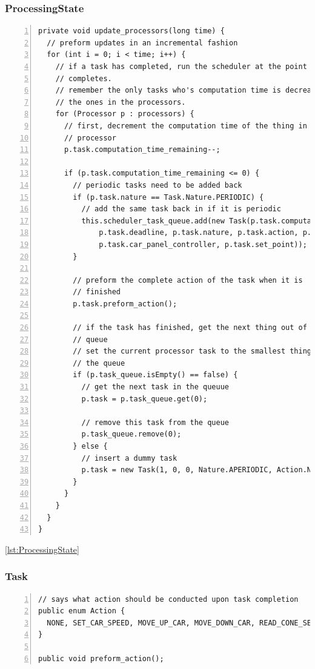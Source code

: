 \documentclass{article} %
\begin{document}
\subsubsection{ProcessingState}
\begin{lstlisting}[float=*,caption={Scheduler call and task queue manipulation},label={lst:ProcessingState},numbers=left]
private void update_processors(long time) {
  // preform updates in an incremental fashion
  for (int i = 0; i < time; i++) {
    // if a task has completed, run the scheduler at the point it
    // completes.
    // remember the only tasks who's computation time is decreasing are
    // the ones in the processors.
    for (Processor p : processors) {
      // first, decrement the computation time of the thing in this
      // processor
      p.task.computation_time_remaining--;

      if (p.task.computation_time_remaining <= 0) {
        // periodic tasks need to be added back
        if (p.task.nature == Task.Nature.PERIODIC) {
          // add the same task back in if it is periodic
          this.scheduler_task_queue.add(new Task(p.task.computation_time_origional, p.task.period,
              p.task.deadline, p.task.nature, p.task.action, p.task.processing_controller,
              p.task.car_panel_controller, p.task.set_point));
        }

        // preform the complete action of the task when it is
        // finished
        p.task.preform_action();

        // if the task has finished, get the next thing out of the
        // queue
        // set the current processor task to the smallest thing in
        // the queue
        if (p.task_queue.isEmpty() == false) {
          // get the next task in the queuue
          p.task = p.task_queue.get(0);

          // remove this task from the queue
          p.task_queue.remove(0);
        } else {
          // insert a dummy task
          p.task = new Task(1, 0, 0, Nature.APERIODIC, Action.NONE, null, null, 0);
        }
      }
    }
  }
}
\end{lstlisting}

\ref{lst:ProcessingState}

\subsubsection{Task}
\begin{lstlisting}[caption={Tasks know how to preform their actions},label={lst:task},numbers=left]
// says what action should be conducted upon task completion
public enum Action {
  NONE, SET_CAR_SPEED, MOVE_UP_CAR, MOVE_DOWN_CAR, READ_CONE_SENSOR, READ_OTHER_CAR_SENSOR, READ_SPEED_SIGN_SENSOR, READ_STOP_SIGN_SENSOR;
}

public void preform_action();
\end{lstlisting}
\end{document}
